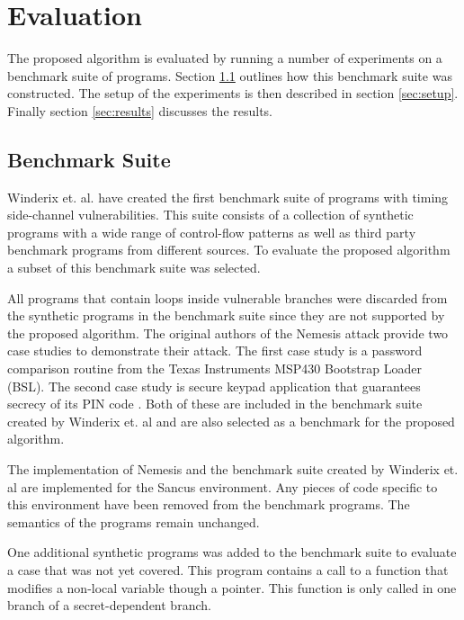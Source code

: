 
\chapter{Evaluation}
\label{cha:evaluation}
The proposed algorithm is evaluated by running a number of experiments on a benchmark suite of programs. 
Section \ref{sec:benchmark-suite} outlines how this benchmark suite was constructed. 
The setup of the experiments is then described in section \ref{sec:setup}. Finally section \ref{sec:results} discusses the results. 

\section{Benchmark Suite}
\label{sec:benchmark-suite}
Winderix et. al. \cite{WinderixHans} have created the first benchmark suite of programs with timing side-channel vulnerabilities. This suite consists of a 
collection of synthetic programs with a wide range of control-flow patterns as well as third party benchmark programs from different sources. 
To evaluate the proposed algorithm a subset of this benchmark suite was selected. 

All programs that contain loops inside vulnerable branches were discarded from the synthetic programs in the benchmark suite
since they are not supported by the proposed algorithm. 
The original authors of the Nemesis attack provide two case studies to demonstrate their attack. 
The first case study is a password comparison routine from the Texas Instruments MSP430 Bootstrap Loader (BSL). 
The second case study is secure keypad application that guarantees secrecy of its PIN code \cite{Nemesis}.
Both of these are included in the benchmark suite created by Winderix et. al and are also selected as a benchmark for the proposed algorithm. 

The implementation of Nemesis and the benchmark suite created by Winderix et. al are implemented for the Sancus environment. Any pieces of code specific to this
environment have been removed from the benchmark programs. The semantics of the programs remain unchanged. 

One additional synthetic programs was added to the benchmark suite to evaluate a case that was not yet covered. This program contains a call to a function that 
modifies a non-local variable though a pointer. This function is only called in one branch of a secret-dependent branch. 

